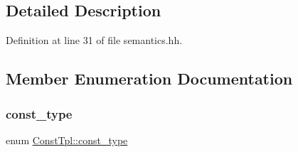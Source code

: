 \subsection{Detailed Description}


Definition at line 31 of file semantics.\+hh.



\subsection{Member Enumeration Documentation}
\mbox{\label{class_const_tpl_af7f677ee5ef2e5af1becb0109793396b}} 
\subsubsection{\texorpdfstring{const\_type}{const\_type}}
{\footnotesize\ttfamily enum \mbox{\hyperlink{class_const_tpl_af7f677ee5ef2e5af1becb0109793396b}{Const\+Tpl\+::const\+\_\+type}}}

